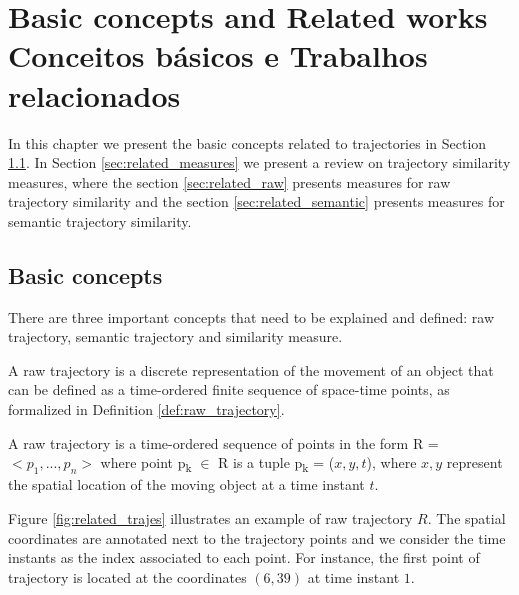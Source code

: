 

\chapter[\lang{Basic concepts and Related works}{Conceitos básicos e Trabalhos relacionados}]
{
    \lang
    {Basic concepts and Related works}
    {Conceitos básicos e Trabalhos relacionados}
}
\label{sec:related}

\begin{flushright}
    \englishword{ }
\end{flushright}


In this chapter we present the basic concepts related to trajectories in Section \ref{sec:basic_concepts}. In Section \ref{sec:related_measures} we present a review on trajectory similarity measures, where the section \ref{sec:related_raw} presents measures for raw trajectory similarity and the section \ref{sec:related_semantic} presents measures for semantic trajectory similarity.

\section{Basic concepts} \label{sec:basic_concepts}
There are three important concepts that need to be explained and defined: raw trajectory, semantic trajectory and similarity measure.

A raw trajectory is a discrete representation of the movement of an object that can be defined as a time-ordered finite sequence of space-time points, as formalized in Definition \ref{def:raw_trajectory}. 

\begin{definition} \label{def:raw_trajectory}
A raw trajectory is a time-ordered sequence of points in the form R = $<p_1,...,p_n>$ where point p\textsubscript{k} $\in$ R is a tuple p\textsubscript{k} = ($x,y,t$), where $x,y$ represent the spatial location of the moving object at a time instant $t$.
\end{definition}

Figure \ref{fig:related_trajes} illustrates an example of raw trajectory $R$. The spatial coordinates are annotated next to the trajectory points and we consider the time instants as the index associated to each point. For instance, the first point of trajectory is located at the coordinates $(6,39)$ at time instant $1$.

